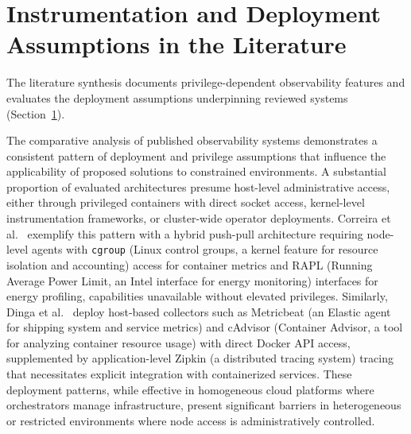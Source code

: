 \section{Instrumentation and Deployment Assumptions in the Literature}
\label{sec:instrumentation-assumptions}

The literature synthesis documents privilege-dependent observability features and evaluates the deployment assumptions underpinning reviewed systems (Section~\ref{sec:instrumentation-assumptions}).

The comparative analysis of published observability systems demonstrates a consistent pattern of deployment and privilege assumptions that influence the applicability of proposed solutions to constrained environments. A substantial proportion of evaluated architectures presume host-level administrative access, either through privileged containers with direct socket access, kernel-level instrumentation frameworks, or cluster-wide operator deployments. Correira et al.~\cite{correiaMonintainerOrchestrationindependentExtensible2023} exemplify this pattern with a hybrid push-pull architecture requiring node-level agents with \texttt{cgroup} (Linux control groups, a kernel feature for resource isolation and accounting) access for container metrics and RAPL (Running Average Power Limit, an Intel interface for energy monitoring) interfaces for energy profiling, capabilities unavailable without elevated privileges. Similarly, Dinga et al.~\cite{dingaEmpiricalEvaluationEnergy2023} deploy host-based collectors such as Metricbeat (an Elastic agent for shipping system and service metrics) and cAdvisor (Container Advisor, a tool for analyzing container resource usage) with direct Docker API access, supplemented by application-level Zipkin (a distributed tracing system) tracing that necessitates explicit integration with containerized services. These deployment patterns, while effective in homogeneous cloud platforms where orchestrators manage infrastructure, present significant barriers in heterogeneous or restricted environments where node access is administratively controlled.


